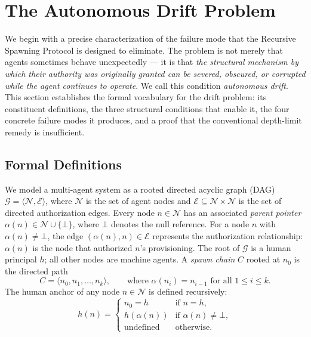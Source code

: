 \section{The Autonomous Drift Problem}
\label{sec:rs-drift}

We begin with a precise characterization of the failure mode that the Recursive Spawning Protocol is designed to eliminate.  The problem is not merely that agents sometimes behave unexpectedly — it is that \emph{the structural mechanism by which their authority was originally granted can be severed, obscured, or corrupted while the agent continues to operate}.  We call this condition \emph{autonomous drift}.  This section establishes the formal vocabulary for the drift problem: its constituent definitions, the three structural conditions that enable it, the four concrete failure modes it produces, and a proof that the conventional depth-limit remedy is insufficient.

\subsection{Formal Definitions}

We model a multi-agent system as a rooted directed acyclic graph (DAG) $\mathcal{G} = \langle \mathcal{N}, \mathcal{E} \rangle$, where $\mathcal{N}$ is the set of agent nodes and $\mathcal{E} \subseteq \mathcal{N} \times \mathcal{N}$ is the set of directed authorization edges.  Every node $n \in \mathcal{N}$ has an associated \emph{parent pointer} $\alpha(n) \in \mathcal{N} \cup \{\bot\}$, where $\bot$ denotes the null reference.  For a node $n$ with $\alpha(n) \neq \bot$, the edge $(\alpha(n), n) \in \mathcal{E}$ represents the authorization relationship: $\alpha(n)$ is the node that authorized $n$'s provisioning.  The root of $\mathcal{G}$ is a human principal $h$; all other nodes are machine agents.  A \emph{spawn chain} $C$ rooted at $n_0$ is the directed path
\[
C = \langle n_0, n_1, \ldots, n_k \rangle,
\qquad \text{where } \alpha(n_i) = n_{i-1} \text{ for all } 1 \leq i \leq k.
\]
The human anchor of any node $n \in \mathcal{N}$ is defined recursively:
\[
h(n) =
\begin{cases}
n_0 = h      & \text{if } n = h, \\
h(\alpha(n)) & \text{if } \alpha(n) \neq \bot, \\
\text{undefined} & \text{otherwise.}
\end{cases}
\tag{1}
\]

